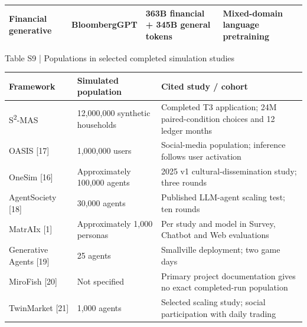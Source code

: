 \documentclass[10pt]{article}
\begin{document}
\begin{center}
\begin{minipage}{\textwidth}
\begin{tabularx}{\textwidth}{@{}XXXX@{}}
Financial generative & BloombergGPT & 363B financial + 345B general tokens & Mixed-domain language pretraining \\
\bottomrule
\end{tabularx}
\par{}
\end{minipage}
\end{center}

\begin{center}
\begin{minipage}{\textwidth}
\fontsize{8.5}{10.3}\selectfont
Table S9 | Populations in selected completed simulation studies
\par\vspace{4pt}
\begin{tabularx}{\textwidth}{@{}XXX@{}}
\toprule
Framework & Simulated population & Cited study / cohort \\
\midrule
S\textsuperscript{2}-MAS & 12,000,000 synthetic households & Completed T3 application; 24M paired-condition choices and 12 ledger months \\
OASIS [17] & 1,000,000 users & Social-media population; inference follows user activation \\
OneSim [16] & Approximately 100,000 agents & 2025 v1 cultural-dissemination study; three rounds \\
AgentSociety [18] & 30,000 agents & Published LLM-agent scaling test; ten rounds \\
MatrAIx [1] & Approximately 1,000 personas & Per study and model in Survey, Chatbot and Web evaluations \\
Generative Agents [19] & 25 agents & Smallville deployment; two game days \\
MiroFish [20] & Not specified & Primary project documentation gives no exact completed-run population \\
TwinMarket [21] & 1,000 agents & Selected scaling study; social participation with daily trading \\
\bottomrule
\end{tabularx}
\par{}
\end{minipage}
\end{center}
\end{document}

